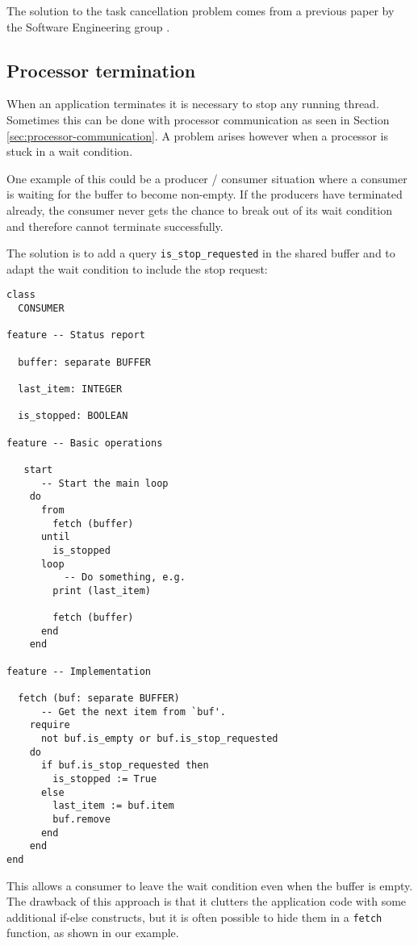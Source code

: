 The solution to the task cancellation problem comes from a previous paper by the Software Engineering group \cite{paper:task-cancellation}.

\subsection{Processor termination}
\label{sec:processor-termination}

When an application terminates it is necessary to stop any running thread.
Sometimes this can be done with processor communication as seen in Section \ref{sec:processor-communication}.
A problem arises however when a processor is stuck in a wait condition.

One example of this could be a producer / consumer situation where a consumer is waiting for the buffer to become non-empty.
If the producers have terminated already, the consumer never gets the chance to break out of its wait condition and therefore cannot terminate successfully.

The solution is to add a query \lstinline!is_stop_requested! in the shared buffer and to adapt the wait condition to include the stop request:

\begin{lstlisting}[language=OOSC2Eiffel, captionpos=b, caption={Breaking out of a wait condition.}]
class
  CONSUMER

feature -- Status report

  buffer: separate BUFFER
  
  last_item: INTEGER
  
  is_stopped: BOOLEAN
  
feature -- Basic operations
  
   start
      -- Start the main loop
    do
      from
        fetch (buffer)
      until 
        is_stopped
      loop
          -- Do something, e.g.
        print (last_item)

        fetch (buffer)
      end
    end
  
feature -- Implementation

  fetch (buf: separate BUFFER)
      -- Get the next item from `buf'.
    require
      not buf.is_empty or buf.is_stop_requested
    do
      if buf.is_stop_requested then
        is_stopped := True
      else
        last_item := buf.item
        buf.remove
      end
    end
end
\end{lstlisting}

This allows a consumer to leave the wait condition even when the buffer is empty.
The drawback of this approach is that it clutters the application code with some additional if-else constructs, 
but it is often possible to hide them in a \lstinline!fetch! function, as shown in our example.
